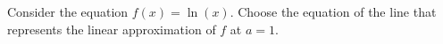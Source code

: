 \documentclass{ximera}
\author{Nela Lakos \and Kyle Parsons}
\begin{document}
\begin{exercise}

Consider the equation $f(x) = \ln(x)$.  Choose the equation of the line that represents the linear approximation of $f$ at $a=1$.
\begin{multipleChoice}
\end{multipleChoice}

\end{exercise}
\end{document}
